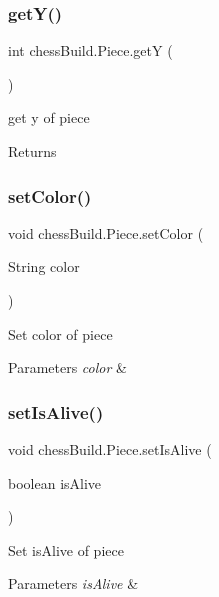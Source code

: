 \subsubsection{\texorpdfstring{get\+Y()}{getY()}}
{\footnotesize\ttfamily int chess\+Build.\+Piece.\+getY (\begin{DoxyParamCaption}{ }\end{DoxyParamCaption})}

get y of piece \begin{DoxyReturn}{Returns}

\end{DoxyReturn}
\mbox{\label{classchess_build_1_1_piece_a06fc50dacba109b1a3903045f33dd61a}} 
\subsubsection{\texorpdfstring{set\+Color()}{setColor()}}
{\footnotesize\ttfamily void chess\+Build.\+Piece.\+set\+Color (\begin{DoxyParamCaption}\item[{String}]{color }\end{DoxyParamCaption})}

Set color of piece 
\begin{DoxyParams}{Parameters}
{\em color} & \\
\hline
\end{DoxyParams}
\mbox{\label{classchess_build_1_1_piece_a15d7482399188a3635f13b11c4a57d1a}} 
\subsubsection{\texorpdfstring{set\+Is\+Alive()}{setIsAlive()}}
{\footnotesize\ttfamily void chess\+Build.\+Piece.\+set\+Is\+Alive (\begin{DoxyParamCaption}\item[{boolean}]{is\+Alive }\end{DoxyParamCaption})}

Set is\+Alive of piece 
\begin{DoxyParams}{Parameters}
{\em is\+Alive} & \\
\hline
\end{DoxyParams}
\mbox{\label{classchess_build_1_1_piece_abcd8667e17514a6dcd27c3bd18e41279}} 
